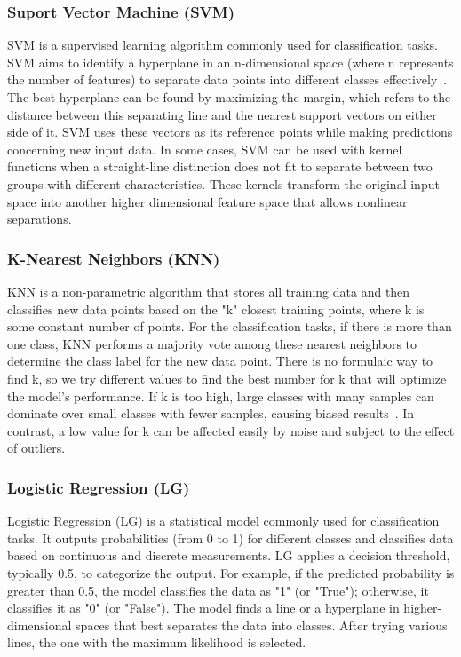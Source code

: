 \documentclass[12pt]{article}
\begin{document}
\subsubsection{Suport Vector Machine (SVM)}
SVM is a supervised learning algorithm commonly used for classification tasks. SVM aims to identify a hyperplane in an n-dimensional space (where n represents the number of features) to separate data points into different classes effectively~\cite{svm}. The best hyperplane can be found by maximizing the margin, which refers to the distance between this separating line and the nearest support vectors on either side of it. SVM uses these vectors as its reference points while making predictions concerning new input data. In some cases, SVM can be used with kernel functions when a straight-line distinction does not fit to separate between two groups with different characteristics. These kernels transform the original input space into another higher dimensional feature space that allows nonlinear separations.

\subsubsection{K-Nearest Neighbors (KNN)}
KNN is a non-parametric algorithm that stores all training data and then classifies new data points based on the "k" closest training points, where k is some constant number of points. For the classification tasks, if there is more than one class, KNN performs a majority vote among these nearest neighbors to determine the class label for the new data point. There is no formulaic way to find k, so we try different values to find the best number for k that will optimize the model's performance. If k is too high, large classes with many samples can dominate over small classes with fewer samples, causing biased results~\cite{mucherino2009k}. In contrast, a low value for k can be affected easily by noise and subject to the effect of outliers.
\subsubsection{Logistic Regression (LG)}
Logistic Regression (LG) is a statistical model commonly used for classification tasks. It outputs probabilities (from 0 to 1) for different classes and classifies data based on continuous and discrete measurements. LG applies a decision threshold, typically 0.5, to categorize the output. For example, if the predicted probability is greater than 0.5, the model classifies the data as "1" (or "True"); otherwise, it classifies it as "0" (or "False"). The model finds a line or a hyperplane in higher-dimensional spaces that best separates the data into classes. After trying various lines, the one with the maximum likelihood is selected.
  
\end{document}
